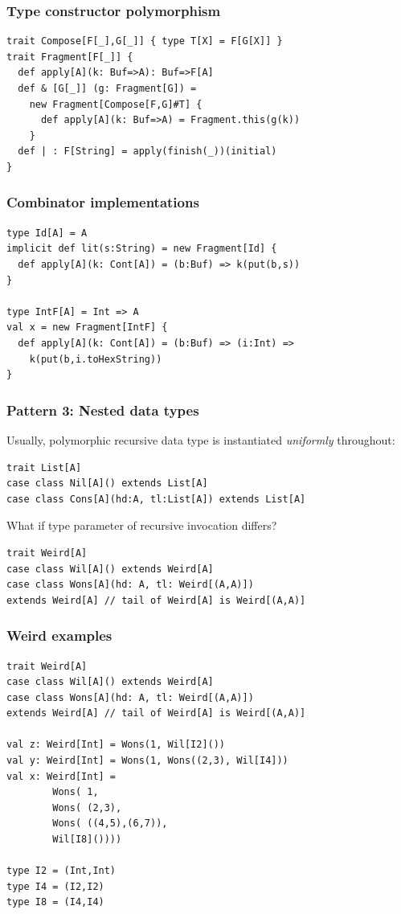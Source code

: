 \documentclass[14pt,t,usepdftitle=false,
xcolornames=x11names,svgnames,dvipsnames]{beamer}
\begin{document}
\begin{frame}[fragile]
  \frametitle{Type constructor polymorphism}
\begin{lstlisting}[style=scala,moreemph={Buf}]
trait Compose[F[_],G[_]] { type T[X] = F[G[X]] }
trait Fragment[F[_]] {
  def apply[A](k: Buf=>A): Buf=>F[A]
  def & [G[_]] (g: Fragment[G]) =
    new Fragment[Compose[F,G]#T] {
      def apply[A](k: Buf=>A) = Fragment.this(g(k))
    }
  def | : F[String] = apply(finish(_))(initial)
}
\end{lstlisting}
\end{frame}

\begin{frame}[fragile]
  \frametitle{Combinator implementations}
\begin{lstlisting}[style=scala,moreemph={Buf}]
type Id[A] = A
implicit def lit(s:String) = new Fragment[Id] {
  def apply[A](k: Cont[A]) = (b:Buf) => k(put(b,s))
}

type IntF[A] = Int => A
val x = new Fragment[IntF] {
  def apply[A](k: Cont[A]) = (b:Buf) => (i:Int) =>
    k(put(b,i.toHexString))
}
\end{lstlisting}
\end{frame}

\begin{frame}[fragile]
  \frametitle{Pattern 3: Nested data types}
  Usually, polymorphic recursive data type is instantiated
  \emph{uniformly} throughout:
\begin{lstlisting}[style=scala]
trait List[A]
case class Nil[A]() extends List[A]
case class Cons[A](hd:A, tl:List[A]) extends List[A]
\end{lstlisting}
  What if type parameter of recursive invocation differs?
\begin{lstlisting}[style=scala,moreemph={Weird}]
trait Weird[A]
case class Wil[A]() extends Weird[A]
case class Wons[A](hd: A, tl: Weird[(A,A)])
extends Weird[A] // tail of Weird[A] is Weird[(A,A)]
\end{lstlisting}
\end{frame}

\begin{frame}[fragile]
  \frametitle{Weird examples}
\begin{lstlisting}[style=scala,moreemph={Weird}]
trait Weird[A]
case class Wil[A]() extends Weird[A]
case class Wons[A](hd: A, tl: Weird[(A,A)])
extends Weird[A] // tail of Weird[A] is Weird[(A,A)]

val z: Weird[Int] = Wons(1, Wil[I2]())
val y: Weird[Int] = Wons(1, Wons((2,3), Wil[I4]))
val x: Weird[Int] =
        Wons( 1,
        Wons( (2,3),
        Wons( ((4,5),(6,7)),
        Wil[I8]())))

type I2 = (Int,Int)
type I4 = (I2,I2)
type I8 = (I4,I4)
\end{lstlisting}
\end{frame}
\end{document}
